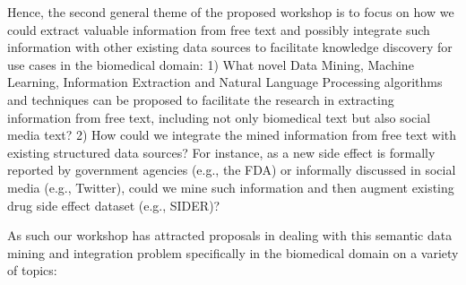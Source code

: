 \documentclass[runningheads,a4paper]{llncs}
\begin{document}
Hence, the second general theme of the proposed workshop is to focus on how we could extract valuable information from free text and possibly integrate such information with other existing data sources to facilitate knowledge discovery for use cases in the biomedical domain: 1) What novel Data Mining, Machine Learning, Information Extraction and Natural Language Processing algorithms and techniques can be proposed to facilitate the research in extracting information from free text, including not only biomedical text but also social media text? 2) How could we integrate the mined information from free text with existing structured data sources? For instance, as a new side effect is formally reported by government agencies (e.g., the FDA) or informally discussed in social media (e.g., Twitter), could we mine such information and then augment existing drug side effect dataset (e.g., SIDER)?

As such our workshop has attracted proposals in dealing with this semantic data mining and integration problem specifically in the biomedical domain on a variety of topics:
\end{document}
